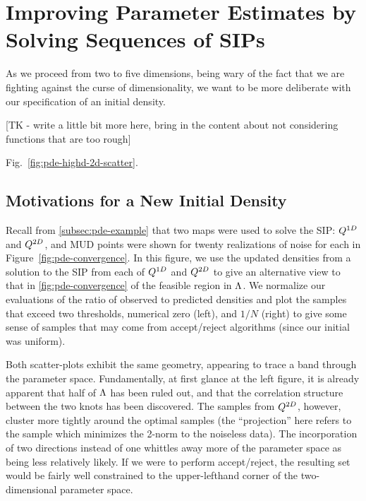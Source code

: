 \section{Improving Parameter Estimates by Solving Sequences of SIPs}\label{sec:mud-pde-sequence}
As we proceed from two to five dimensions, being wary of the fact that we are fighting against the curse of dimensionality, we want to be more deliberate with our specification of an initial density.

[TK - write a little bit more here, bring in the content about not considering functions that are too rough]

Fig.~\ref{fig:pde-highd-2d-scatter}.

\subsection{Motivations for a New Initial Density}
Recall from \ref{subsec:pde-example} that two maps were used to solve the SIP: $Q^{1D}$ and $Q^{2D}$, and MUD points were shown for twenty realizations of noise for each in Figure~\ref{fig:pde-convergence}.
In this figure, we use the updated densities from a solution to the SIP from each of $Q^{1D}$ and $Q^{2D}$ to give an alternative view to that in \ref{fig:pde-convergence} of the feasible region in ${\Lambda}$.
We normalize our evaluations of the ratio of observed to predicted densities and plot the samples that exceed two thresholds, numerical zero (left), and $1/N$ (right) to give some sense of samples that may come from accept/reject algorithms (since our initial was uniform).

Both scatter-plots exhibit the same geometry, appearing to trace a band through the parameter space.
Fundamentally, at first glance at the left figure, it is already apparent that half of ${\Lambda}$ has been ruled out, and that the correlation structure between the two knots has been discovered.
The samples from $Q^{2D}$, however, cluster more tightly around the optimal samples (the ``projection'' here refers to the sample which minimizes the 2-norm to the noiseless data).
The incorporation of two directions instead of one whittles away more of the parameter space as being less relatively likely.
If we were to perform accept/reject, the resulting set would be fairly well constrained to the upper-lefthand corner of the two-dimensional parameter space.

